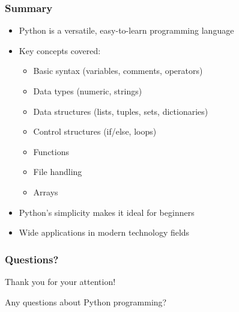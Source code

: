 \documentclass[aspectratio=169]{beamer}
\begin{document}
\begin{frame}
\frametitle{Summary}
\begin{itemize}
\item Python is a versatile, easy-to-learn programming language
\item Key concepts covered:
    \begin{itemize}
    \item Basic syntax (variables, comments, operators)
    \item Data types (numeric, strings)
    \item Data structures (lists, tuples, sets, dictionaries)
    \item Control structures (if/else, loops)
    \item Functions
    \item File handling
    \item Arrays
    \end{itemize}
\item Python's simplicity makes it ideal for beginners
\item Wide applications in modern technology fields
\end{itemize}
\end{frame}

\begin{frame}
\frametitle{Questions?}
\begin{center}
\Large Thank you for your attention!

\vspace{1cm}

Any questions about Python programming?
\end{center}
\end{frame}
\end{document}
